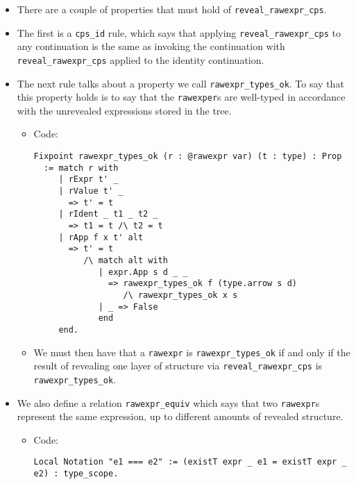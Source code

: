 \documentclass[
]{article}
\providecommand{\tightlist}{%
  \setlength{\itemsep}{0pt}\setlength{\parskip}{0pt}}
\begin{document}
\begin{itemize}
\begin{itemize}
\begin{itemize}
      \begin{itemize}
      \tightlist
      \item
        There are a couple of properties that must hold of
        \texttt{reveal\_rawexpr\_cps}.
      \item
        The first is a \texttt{cps\_id} rule, which says that applying
        \texttt{reveal\_rawexpr\_cps} to any continuation is the same as
        invoking the continuation with \texttt{reveal\_rawexpr\_cps}
        applied to the identity continuation.
      \item
        The next rule talks about a property we call
        \texttt{rawexpr\_types\_ok}. To say that this property holds is
        to say that the \texttt{rawexper}s are well-typed in accordance
        with the unrevealed expressions stored in the tree.

        \begin{itemize}
        \item
          Code:

\begin{verbatim}
Fixpoint rawexpr_types_ok (r : @rawexpr var) (t : type) : Prop
  := match r with
     | rExpr t' _
     | rValue t' _
       => t' = t
     | rIdent _ t1 _ t2 _
       => t1 = t /\ t2 = t
     | rApp f x t' alt
       => t' = t
          /\ match alt with
             | expr.App s d _ _
               => rawexpr_types_ok f (type.arrow s d)
                  /\ rawexpr_types_ok x s
             | _ => False
             end
     end.
\end{verbatim}
        \item
          We must then have that a \texttt{rawexpr} is
          \texttt{rawexpr\_types\_ok} if and only if the result of
          revealing one layer of structure via
          \texttt{reveal\_rawexpr\_cps} is \texttt{rawexpr\_types\_ok}.
        \end{itemize}
      \item
        We also define a relation \texttt{rawexpr\_equiv} which says
        that two \texttt{rawexpr}s represent the same expression, up to
        different amounts of revealed structure.

        \begin{itemize}
        \item
          Code:

\begin{verbatim}
Local Notation "e1 === e2" := (existT expr _ e1 = existT expr _ e2) : type_scope.


\end{verbatim}
\end{itemize}
\end{itemize}
\end{itemize}
\end{itemize}
\end{itemize}
\end{document}
